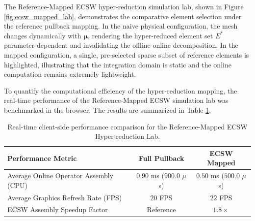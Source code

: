 The Reference-Mapped ECSW hyper-reduction simulation lab, shown in Figure \ref{fig:ecsw_mapped_lab}, demonstrates the comparative element selection under the reference pullback mapping. In the naive physical configuration, the mesh changes dynamically with $\boldsymbol{\mu}$, rendering the hyper-reduced element set $E^*$ parameter-dependent and invalidating the offline-online decomposition. In the mapped configuration, a single, pre-selected sparse subset of reference elements is highlighted, illustrating that the integration domain is static and the online computation remains extremely lightweight.

To quantify the computational efficiency of the hyper-reduction mapping, the real-time performance of the Reference-Mapped ECSW simulation lab was benchmarked in the browser. The results are summarized in Table \ref{tab:ecsw_mapped_benchmarks}.

\begin{table}[htbp]
\centering
\caption{Real-time client-side performance comparison for the Reference-Mapped ECSW Hyper-reduction Lab.}
\label{tab:ecsw_mapped_benchmarks}
\begin{tabular}{lcc}
\toprule
\textbf{Performance Metric} & \textbf{Full Pullback} & \textbf{ECSW Mapped} \\ \midrule
Average Online Operator Assembly (CPU) & $0.90$ ms ($900.0$ $\mu$s) & $0.50$ ms ($500.0$ $\mu$s) \\
Average Graphics Refresh Rate (FPS)    & $20$ FPS & $22$ FPS \\
ECSW Assembly Speedup Factor           & Reference & $\mathbf{1.8\times}$ \\ \bottomrule
\end{tabular}
\end{table}

